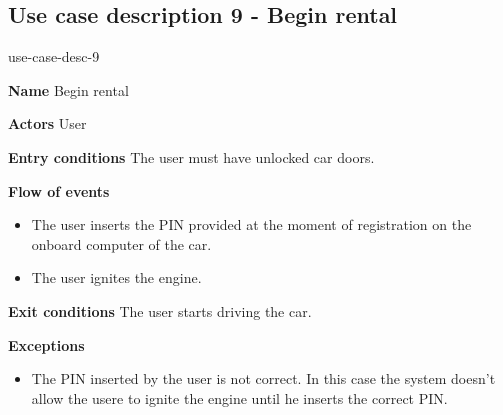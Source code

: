 \subsection{Use case description 9 - Begin rental}
\begin{labeling}{use-case-desc-9}
		\item[\textbf{Name}] Begin rental
		\item[\textbf{Actors}] User
		\item[\textbf{Entry conditions}] The user must have unlocked car doors.
		\item[\textbf{Flow of events}]
			\begin{itemize}
				\item[]
				\item The user inserts the PIN provided at the moment of registration on the onboard computer of the car.
				\item The user ignites the engine.
			\end{itemize}
		\item[\textbf{Exit conditions}] The user starts driving the car.
		\item[\textbf{Exceptions}]
			\begin{itemize}
				\item[]
				\item The PIN inserted by the user is not correct. In this case the system doesn't allow the usere to ignite the engine until he inserts the correct PIN. 
			\end{itemize}
	\end{labeling}